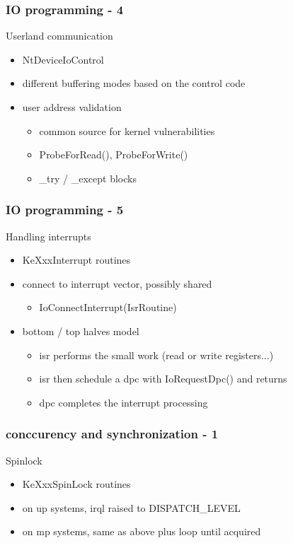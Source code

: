 \begin{frame}
 \frametitle{IO programming - 4}

 Userland communication

 \begin{itemize}
  \item NtDeviceIoControl
  \item different buffering modes based on the control code
  \item user address validation
  \begin{itemize}
   \item common source for kernel vulnerabilities
   \item ProbeForRead(), ProbeForWrite()
   \item \_try / \_except {} blocks
  \end{itemize}
 \end{itemize}

\end{frame}


\begin{frame}
 \frametitle{IO programming - 5}

 Handling interrupts

 \begin{itemize}
  \item KeXxxInterrupt routines

  \item connect to interrupt vector, possibly shared
   \begin{itemize}
   \item IoConnectInterrupt(IsrRoutine)
  \end{itemize}

  \item bottom / top halves model
  \begin{itemize}
   \item isr performs the small work (read or write registers...)
   \item isr then schedule a dpc with IoRequestDpc() and returns
   \item dpc completes the interrupt processing
  \end{itemize}

 \end{itemize}

\end{frame}


\begin{frame}
 \frametitle{conccurency and synchronization - 1}

 Spinlock

 \begin{itemize}
  \item KeXxxSpinLock routines
  \item on up systems, irql raised to DISPATCH\_LEVEL
  \item on mp systems, same as above plus loop until acquired
 \end{itemize}

\end{frame}


